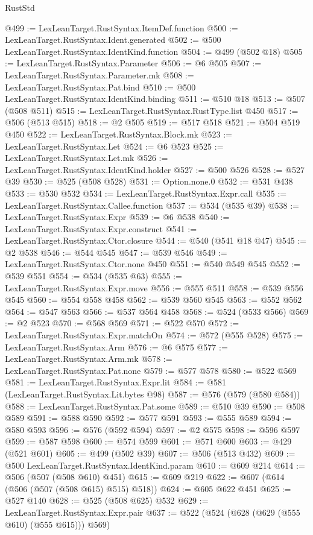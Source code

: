 \begin{lexlean}{RustStd}
\begin{coremodule}
{\begin{coremodule}
{{{{{{{{{{{{{@499 := LexLeanTarget.RustSyntax.ItemDef.function
@500 := LexLeanTarget.RustSyntax.Ident.generated
@502 := @500 LexLeanTarget.RustSyntax.IdentKind.function
@504 := @499 (@502 @18)
@505 := LexLeanTarget.RustSyntax.Parameter
@506 := @6 @505
@507 := LexLeanTarget.RustSyntax.Parameter.mk
@508 := LexLeanTarget.RustSyntax.Pat.bind
@510 := @500 LexLeanTarget.RustSyntax.IdentKind.binding
@511 := @510 @18
@513 := @507 (@508 @511)
@515 := LexLeanTarget.RustSyntax.RustType.list @450
@517 := @506 (@513 @515)
@518 := @2 @505
@519 := @517 @518
@521 := @504 @519 @450
@522 := LexLeanTarget.RustSyntax.Block.mk
@523 := LexLeanTarget.RustSyntax.Let
@524 := @6 @523
@525 := LexLeanTarget.RustSyntax.Let.mk
@526 := LexLeanTarget.RustSyntax.IdentKind.holder
@527 := @500 @526
@528 := @527 @39
@530 := @525 (@508 @528)
@531 := Option.none.{0}
@532 := @531 @438
@533 := @530 @532
@534 := LexLeanTarget.RustSyntax.Expr.call
@535 := LexLeanTarget.RustSyntax.Callee.function
@537 := @534 (@535 @39)
@538 := LexLeanTarget.RustSyntax.Expr
@539 := @6 @538
@540 := LexLeanTarget.RustSyntax.Expr.construct
@541 := LexLeanTarget.RustSyntax.Ctor.closure
@544 := @540 (@541 @18 @47)
@545 := @2 @538
@546 := @544 @545
@547 := @539 @546
@549 := LexLeanTarget.RustSyntax.Ctor.none @450
@551 := @540 @549 @545
@552 := @539 @551
@554 := @534 (@535 @63)
@555 := LexLeanTarget.RustSyntax.Expr.move
@556 := @555 @511
@558 := @539 @556 @545
@560 := @554 @558 @458
@562 := @539 @560 @545
@563 := @552 @562
@564 := @547 @563
@566 := @537 @564 @458
@568 := @524 (@533 @566)
@569 := @2 @523
@570 := @568 @569
@571 := @522 @570
@572 := LexLeanTarget.RustSyntax.Expr.matchOn
@574 := @572 (@555 @528)
@575 := LexLeanTarget.RustSyntax.Arm
@576 := @6 @575
@577 := LexLeanTarget.RustSyntax.Arm.mk
@578 := LexLeanTarget.RustSyntax.Pat.none
@579 := @577 @578
@580 := @522 @569
@581 := LexLeanTarget.RustSyntax.Expr.lit
@584 := @581 (LexLeanTarget.RustSyntax.Lit.bytes @98)
@587 := @576 (@579 (@580 @584))
@588 := LexLeanTarget.RustSyntax.Pat.some
@589 := @510 @39
@590 := @508 @589
@591 := @588 @590
@592 := @577 @591
@593 := @555 @589
@594 := @580 @593
@596 := @576 (@592 @594)
@597 := @2 @575
@598 := @596 @597
@599 := @587 @598
@600 := @574 @599
@601 := @571 @600
@603 := @429 (@521 @601)
@605 := @499 (@502 @39)
@607 := @506 (@513 @432)
@609 := @500 LexLeanTarget.RustSyntax.IdentKind.param
@610 := @609 @214
@614 := @506 (@507 (@508 @610) @451)
@615 := @609 @219
@622 := @607 (@614 (@506 (@507 (@508 @615) @515) @518))
@624 := @605 @622 @451
@625 := @527 @140
@628 := @525 (@508 @625) @532
@629 := LexLeanTarget.RustSyntax.Expr.pair
@637 := @522 (@524 (@628 (@629 (@555 @610) (@555 @615))) @569)
}}}}}}}}}}}}}
\end{coremodule}}
\end{coremodule}
\end{lexlean}
